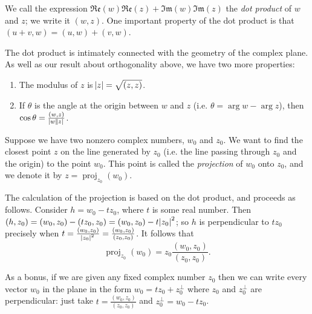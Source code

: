 \documentclass[a4paper,10pt,titlepage]{article}
\theoremstyle{definition}
\DeclareMathOperator{\proj}{proj}
\newcommand*\realp[1]{ \mathfrak{Re} \left ( {#1} \right )  }
\newcommand*\imagp[1]{ \mathfrak{Im} \left ( {#1} \right )  }
\begin{document}
We call the expression $ \realp w \realp z + \imagp w \imagp z $ the \emph{dot product} of $ w $ and $ z $; we write it $ (w, z) $. One
important property of the dot product is that $ (u + v, w) = (u, w) + (v, w) $.

The dot product is intimately connected with the geometry of the complex plane. As well as our result about orthogonality above,
we have two more properties:
\begin{enumerate}
  \item The modulus of $ z $ is $ \abs{z} = \sqrt{(z, z)} $.
  \item If $ \theta $ is the angle at the origin between $ w $ and $ z $ (i.e. $ \theta = \arg w - \arg z $), then $ \cos \theta = \frac{(w,z)}{\abs{w}\abs{z}} $.
\end{enumerate}

Suppose we have two nonzero complex numbers, $ w_0 $ and $ z_0 $. We want to find the closest point $ z $ on the line generated by $ z_0 $
(i.e. the line passing through $ z_0 $ and the origin) to the point $ w_0 $. This point is called the \emph{projection} of $ w_0 $ onto $ z_0 $,
and we denote it by $ z = \proj_{z_0}(w_0) $.

The calculation of the projection is based on the dot product, and proceeds as follows. Consider $ h = w_0 - tz_0 $, where $ t $ is some
real number. Then $ (h, z_0) = (w_0, z_0) - (tz_0, z_0) = (w_0, z_0) - t\abs{z_0}^2 $; so $ h $ is perpendicular to $ tz_0 $ precisely
when $ t = \frac{(w_0, z_0)}{\abs{z_0}^2} = \frac{(w_0, z_0)}{(z_0, z_0)} $. It follows that
\begin{displaymath}
  \proj_{z_0}(w_0) = z_0 \frac{(w_0, z_0)}{(z_0, z_0)}.
\end{displaymath}

As a bonus, if we are given any fixed complex number $ z_0 $ then we can write every vector $ w_0 $ in the plane in the form $ w_0 = tz_0 + z_0^\perp $
where $ z_0 $ and $ z_0^\perp $ are perpendicular: just take $ t = \frac{(w_0, z_0)}{(z_0, z_0)} $ and $ z_0^\perp = w_0 - tz_0 $.
\end{document}
